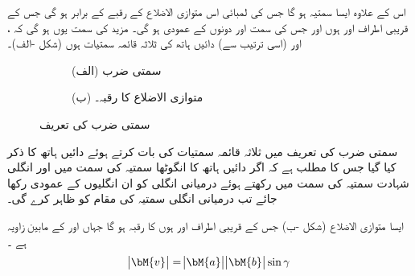 اس کے علاوہ  ایسا سمتیہ ہو گا جس کی لمبائی اس متوازی الاضلاع کے رقبے کے برابر ہو گی جس کے قریبی اطراف  اور  ہوں اور جس کی سمت  اور  دونوں کے عمودی ہو گی۔ مزید  کی سمت یوں ہو گی کہ ،  اور  (اسی ترتیب سے) دائیں ہاتھ کی ثلاثہ قائمہ سمتیات ہوں (شکل -الف)۔
 \begin{figure}
\centering
\begin{subfigure}{0.5\textwidth}
\centering
{}
\caption*{(الف) سمتی ضرب}
\end{subfigure}%
\begin{subfigure}{0.5\textwidth}
\centering
{}
\caption*{(ب) متوازی الاضلاع کا رقبہ۔}
\end{subfigure}%
\caption{سمتی ضرب کی تعریف}
\label{شکل_تعریف_الجبرا_سمتی_ضرب}
\end{figure}
 سمتی ضرب کی تعریف میں ثلاثہ قائمہ سمتیات کی بات کرتے ہوئے  دائیں ہاتھ کا ذکر کیا گیا جس کا مطلب ہے کہ  اگر دائیں ہاتھ کا انگوٹھا سمتیہ  کی سمت میں اور انگلی شہادت سمتیہ  کی سمت میں رکھتے ہوئے  درمیانی انگلی کو ان انگلیوں کے عمودی رکھا جائے تب درمیانی انگلی سمتیہ  کی مقام  کو ظاہر کرے گی۔ 

ایسا متوازی الاضلاع (شکل -ب) جس کے قریبی اطراف  اور  ہوں کا رقبہ
  ہو گا جہاں  اور  کے مابین زاویہ  ہے ۔
\begin{align}\label{مساوات_الجبرا_سمتی_ضرب_رقبہ}
\abs{\bM{v}}=\abs{\bM{a}}\abs{\bM{b}}\sin \gamma
\end{align}

